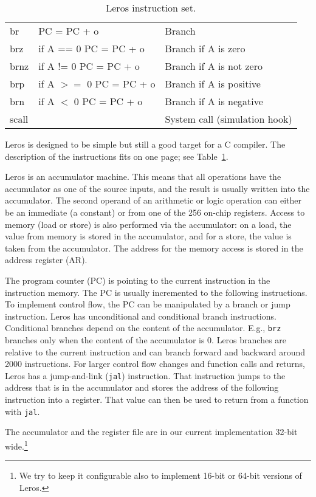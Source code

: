 \documentclass[%
    10pt,
    headinclude, footexclude,
    openright, %
    notitlepage,
    cleardoubleempty,
    headsepline,
    pointlessnumbers,
    bibtotoc, idxtotoc,
    ]{scrbook}
\newcommand{\code}[1]{{\lstinline[basicstyle=\small\ttfamily]{#1}}}
\begin{document}
\begin{table}
\begin{tabular}{lll}
br & PC = PC + o & Branch \\
brz & if A == 0 PC = PC + o & Branch if A is zero \\
brnz & if A != 0 PC = PC + o  & Branch if A is not zero \\
brp & if A $>=$ 0 PC = PC + o & Branch if A is positive \\
brn & if A $<$ 0 PC = PC + o & Branch if A is negative \\
scall &  & System call (simulation hook) \\
\bottomrule
\end{tabular}
\caption{Leros instruction set.}
\label{tab:leros:isa}
\end{table}

Leros is designed to be simple but still a good target for a C compiler.
The description of the instructions fits on one page; see Table~\ref{tab:leros:isa}.

Leros is an accumulator machine. This means that all operations
have the accumulator as one of the source inputs, and the result is usually
written into the accumulator. The second operand of an arithmetic or logic
operation can either be an immediate (a constant) or from one of the 256
on-chip registers. Access to memory (load or store) is also performed via
the accumulator: on a load, the value from memory is stored in the accumulator,
and for a store, the value is taken from the accumulator. The address for the
memory access is stored in the address register (AR).

The program counter (PC) is pointing to the current instruction in the
instruction memory. The PC is usually incremented to the following instructions.
To implement control flow, the PC can be manipulated by a branch
or jump instruction.
Leros has unconditional and conditional branch instructions.
Conditional branches depend on the content of the accumulator.
E.g., \code{brz} branches only when the content of the accumulator is 0.
Leros branches are relative to the current instruction and can branch forward
and backward around 2000 instructions.
For larger control flow changes and function calls and returns,
Leros has a jump-and-link (\code{jal}) instruction.
That instruction jumps to the address that is in the accumulator and
stores the address of the following instruction into a register.
That value can then be used to return from a function with \code{jal}.

The accumulator and the register file are in our current implementation
32-bit wide.\footnote{We try to keep it configurable also
to implement 16-bit or 64-bit versions of Leros.}
\end{document}
